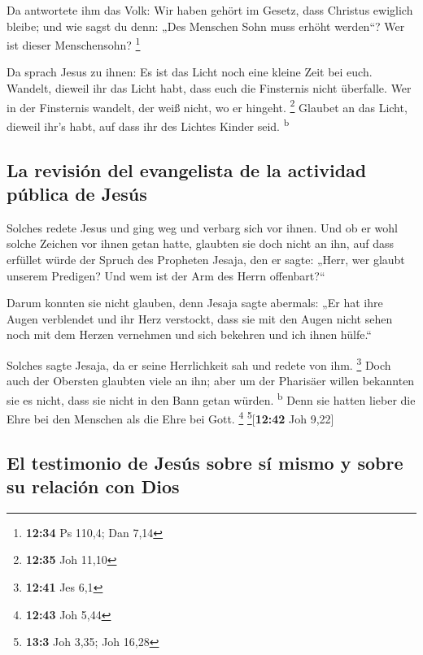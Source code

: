  Da antwortete ihm das Volk: Wir haben gehört im Gesetz,
dass Christus ewiglich bleibe; und wie sagst du denn: „Des Menschen Sohn
muss erhöht werden``? Wer ist dieser Menschensohn? \footnote{\textbf{12:34}
  Ps 110,4; Dan 7,14}

 Da sprach Jesus zu ihnen: Es ist das Licht noch eine
kleine Zeit bei euch. Wandelt, dieweil ihr das Licht habt, dass euch die
Finsternis nicht überfalle. Wer in der Finsternis wandelt, der weiß
nicht, wo er hingeht. \footnote{\textbf{12:35} Joh 11,10}
 Glaubet an das Licht, dieweil ihr's habt, auf dass ihr
des Lichtes Kinder seid. \textsuperscript{b}

\hypertarget{la-revisiuxf3n-del-evangelista-de-la-actividad-puxfablica-de-jesuxfas}{%
\subsection{La revisión del evangelista de la actividad pública de
Jesús}\label{la-revisiuxf3n-del-evangelista-de-la-actividad-puxfablica-de-jesuxfas}}

 Solches redete Jesus und ging weg und verbarg sich vor
ihnen. Und ob er wohl solche Zeichen vor ihnen getan hatte, glaubten sie
doch nicht an ihn,  auf dass erfüllet würde der Spruch
des Propheten Jesaja, den er sagte: „Herr, wer glaubt unserem Predigen?
Und wem ist der Arm des Herrn offenbart?{}``

 Darum konnten sie nicht glauben, denn Jesaja sagte
abermals:  „Er hat ihre Augen verblendet und ihr Herz
verstockt, dass sie mit den Augen nicht sehen noch mit dem Herzen
vernehmen und sich bekehren und ich ihnen hülfe.``

 Solches sagte Jesaja, da er seine Herrlichkeit sah und
redete von ihm. \footnote{\textbf{12:41} Jes 6,1}  Doch
auch der Obersten glaubten viele an ihn; aber um der Pharisäer willen
bekannten sie es nicht, dass sie nicht in den Bann getan würden.
\textsuperscript{b}  Denn sie hatten lieber die Ehre bei
den Menschen als die Ehre bei Gott. \footnote{\textbf{12:43} Joh 5,44}
\footnote{\textbf{13:3} Joh 3,35; Joh 16,28}{[}\textbf{12:42} Joh
9,22{]}

\hypertarget{el-testimonio-de-jesuxfas-sobre-suxed-mismo-y-sobre-su-relaciuxf3n-con-dios}{%
\subsection{El testimonio de Jesús sobre sí mismo y sobre su relación
con
Dios}\label{el-testimonio-de-jesuxfas-sobre-suxed-mismo-y-sobre-su-relaciuxf3n-con-dios}}

